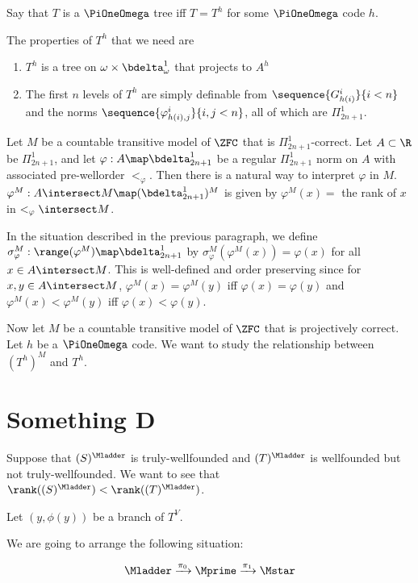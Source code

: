 \documentclass[oneside,12pt]{amsart}
\begin{document}
Say that $T$ is a $\PiOneOmega$ tree iff $T=T^h$ for some $\PiOneOmega$ code $h$.


The properties of $T^h$ that we need are
\begin{enumerate}
\item $T^h$ is a tree on $\omega\times\bdelta^1_{\omega}$ that projects to $A^h$
\item The first $n$ levels of $T^h$ are simply definable from $\sequence{G^i_{h(i)}}{i<n}$ and
the norms $\sequence{\varphi^i_{h(i), j}}{i,j<n}$, all of which are $\Pi^1_{2n+1}$.
\end{enumerate}

Let $M$ be a countable transitive model of $\ZFC$ that is $\Pi^1_{2n+1}$-correct.
Let $A\subset\R$ be $\Pi^1_{2n+1}$, and let $\varphi:A\map\bdelta^1_{2n+1}$ be a regular
$\Pi^1_{2n+1}$ norm on $A$ with associated pre-wellorder $<_\varphi$.
Then there is a natural way to interpret $\varphi$ in $M$.
$\varphi^M:A\intersect M \map (\bdelta^1_{2n+1})^M$
is given by $\varphi^M(x) = $ the rank of $x$ in $<_\varphi \intersect M$.

\begin{definition}
In the situation described in the previous paragraph, we define
$\sigma^M_{\varphi}:\range(\varphi^M)\map\bdelta^1_{2n+1}$ by
$\sigma^M_{\varphi}(\varphi^M(x))=\varphi(x)$ for all $x\in A \intersect M$.
This is well-defined and order preserving since for $x,y\in A\intersect M$,
$\varphi^M(x)=\varphi^M(y)$ iff $\varphi(x)=\varphi(y)$ and
$\varphi^M(x)<\varphi^M(y)$ iff $\varphi(x)<\varphi(y)$.
\end{definition}

Now let $M$ be a countable transitive model of $\ZFC$ that is projectively correct.
Let $h$ be a $\PiOneOmega$ code. We want to study the relationship between
$(T^h)^M$ and $T^h$.

\section{Something D}
\label{section:somethingd}

Suppose that $(S)^{\Mladder}$ is truly-wellfounded and $(T)^{\Mladder}$ is
wellfounded but not truly-wellfounded. We want to see that
$\rank((S)^{\Mladder}) < \rank((T)^{\Mladder})$.

Let $(y,\phi(y))$ be a branch of $T^V$.


We are going to arrange the following situation:

\begin{equation}
\label{big-setup}
\Mladder \xrightarrow{\pi_0} \Mprime \xrightarrow{\pi_1} \Mstar
\end{equation}
\end{document}
